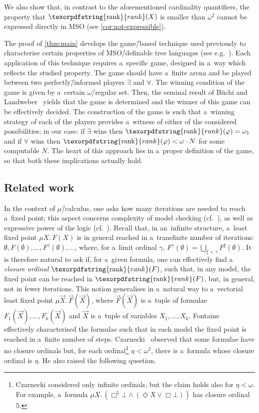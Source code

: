 \documentclass[11pt,a4paper]{amsart}
\theoremstyle{plain}
\theoremstyle{definition}
\theoremstyle{defC}
\theoremstyle{thmC}
\theoremstyle{plain}
\numberwithin{equation}{section}
\numberwithin{equation}{section}
\numberwithin{figure}{section}
\newcommand{\ident}[1]{\ensuremath{\texorpdfstring{\mathrm{\mathnm{#1}}}{#1}}\xspace}
\newcommand{\mathnm}[1]{#1}
\newcommand{\rank}{\ident{rank}}
\renewcommand\phi\varphi
\newcommand{\eve}{\ensuremath{\exists}\xspace}
\newcommand{\adam}{\ensuremath{\forall}\xspace}
\newcommand{\limit}{\ident{rank}}
\begin{document}
\noindent %
We also show that, in contrast to the aforementioned cardinality quantifiers, the property that $\rank(X)$ is smaller than $\omega^2$ cannot be expressed directly in MSO (see \cref{cor:not-expressible}).

The proof of \cref{thm:main} develops the game\=/based technique used previously to characterise certain properties of MSO\=/definable tree languages (see e.g.~\cite{clemente_separability,walukiewicz_buchi}).
Each application of this technique requires a~specific game, designed in a~way which reflects the studied property.
The game should have a~finite arena and be played between two perfectly\=/informed players \eve and \adam.
The winning condition of the game is given by a~certain $\omega$\=/regular set.
Then, the seminal result of Büchi and Landweber~\cite{buchi_synthesis} yields that the game is determined and the winner of this game can be effectively decided.
The construction of the game is such that a~winning strategy of each of the players provides a~witness of either of the considered possibilities; in our case:
if \eve wins then $\limit(\phi)=\omega_1$ and if \adam wins then $\limit(\phi) < \omega\cdot N$ for some computable $N$.
The heart of this approach lies in a~proper definition of the game, so that both these implications actually hold.


\subsection*{Related work}

In the context of $\mu$\=/calculus, one asks how many iterations are needed to reach a~fixed point;
this aspect concerns complexity of model checking (cf.~\cite{julian-igor-handook,esparza-acceleration}), as well as expressive power of the logic (cf.~\cite{julian-igor-handook,bradfield_transfinite}).
Recall that, in an~infinite structure, a~least fixed point $\mu X.\, F(X)$ is in general reached in a~transfinite number of iterations:
$\emptyset, F(\emptyset),\ldots, F^{\gamma}(\emptyset), \ldots$, where, for a~limit ordinal $\gamma$, $F^{\gamma}(\emptyset) = \bigcup_{\xi < \gamma} F^{\xi}(\emptyset)$.
It is therefore natural to ask if, for a~given formula, one can effectively find a \emph{closure ordinal} $\limit(F)$,
such that, in any model, the fixed point can be reached in $\limit(F)$, but, in general, not in fewer iterations.
This notion generalises in a~natural way to a~vectorial least fixed point $\mu \vec{X}.\,\vec{F}(\vec{X})$,
where $\vec{F}(\vec{X})$ is a~tuple of formulae $F_1(\vec{X}),\dots,F_k(\vec{X})$ and $\vec{X}$ is a~tuple of variables $X_1,\dots,X_k$.
Fontaine~\cite{fontaine_continuous} effectively characterised the formulae such that in each model the fixed point is reached in a~finite number of steps.
Czarnecki~\cite{czarnecki_closure_fics} observed that some formulae have no closure ordinals but, for each ordinal\footnote{Czarnecki considered only infinite ordinals, but the claim holds also for $\eta < \omega$. For example, a~formula $\mu X.\, \left(\Box^5 \bot \wedge(\Diamond X \vee \Box \bot) \right)$ has closure ordinal $5$.} $\eta < \omega^2$, there is a~formula whose closure ordinal is $\eta$.
He also raised the following question.
\end{document}
